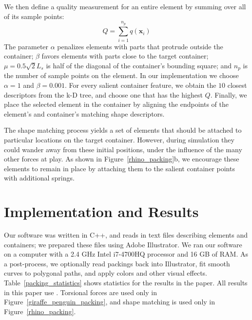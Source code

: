 We then define a quality measurement for an entire element by summing over
all of its sample points:
\begin{equation}
Q = \sum_{i = 1}^{n_p} q(\bm{x}_i)
\end{equation}
The parameter $\alpha$ penalizes elements with parts that protrude outside
the container; $\beta$ favors elements with parts close to the target container; 
$\mu = 0.5 \sqrt{2}L_{s}$ is half of the diagonal of the container's
bounding square; and $n_p$ is the number of sample points on the element.
In our implementation we choose $\alpha = 1$ and $\beta = 0.001$.
For every salient container feature, we obtain the $10$ closest descriptors from the k-D tree, and choose one that has the highest $Q$.
Finally, we place the selected element in the container by 
aligning the endpoints of the element's and container's matching shape 
descriptors.

The shape matching process yields a set of elements that should be attached
to particular locations on the target container.  However, during simulation
they could wander away from these initial positions, under the influence of
the many other forces at play.  As shown in Figure~\ref{rhino_packing}b, we
encourage these elements to remain in place by attaching them to the salient
container points with additional springs.

\section{Implementation and Results}
\label{repulsionpak_results}

Our software was written in C++, and reads in text files describing
elements and containers; we prepared these files using
Adobe Illustrator.  We ran
our software on a computer with a 2.4 GHz Intel i7-4700HQ processor
and 16 GB of RAM.  As a post-process, we optionally read packings
back into Illustrator, fit smooth curves to polygonal paths, and
apply colors and other visual effects.  Table~\ref{packing_statistics}
shows statistics for the results in the paper.  All results in this
paper use .
Torsional forces are used only in Figure~\ref{giraffe_penguin_packing},
and shape matching is used only in Figure~\ref{rhino_packing}.



